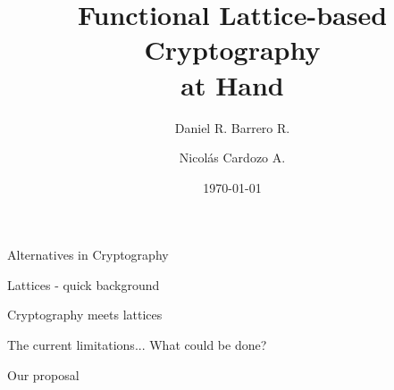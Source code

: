 \documentclass{beamer}
\title{Functional Lattice-based Cryptography \\ at Hand}
\author{Daniel R. Barrero R. \and Nicolás Cardozo A.}
\institute{Universidad de los Andes}
\date{\today}
\theoremstyle{definition}
\begin{document}
\frame{\titlepage}


\begin{frame}{Alternatives in Cryptography}

    
\end{frame}


\begin{frame}{Lattices - quick background}


    
\end{frame}


\begin{frame}{Cryptography meets lattices}


    
\end{frame}


\begin{frame}{The current limitations... What could be done?}

    
\end{frame}


\begin{frame}{Our proposal}

\end{frame}

\end{document}
